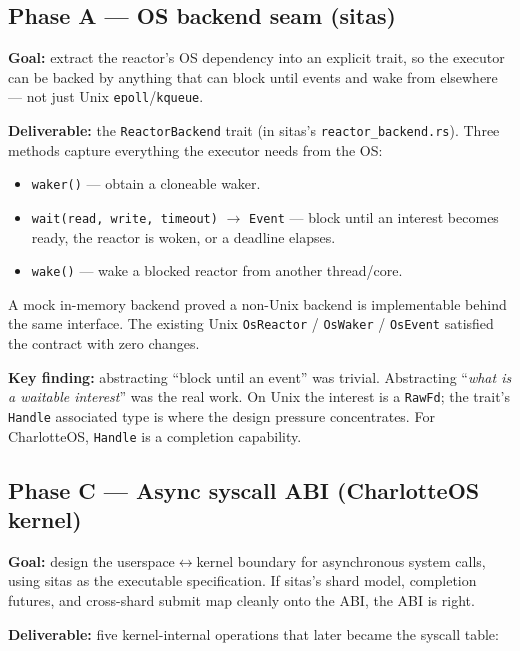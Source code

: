 \subsection{Phase A --- OS backend seam (sitas)}

\textbf{Goal:} extract the reactor's OS dependency into an explicit trait, so
the executor can be backed by anything that can block until events and wake
from elsewhere --- not just Unix \texttt{epoll}/\texttt{kqueue}.

\textbf{Deliverable:} the \texttt{ReactorBackend} trait (in sitas's
\texttt{reactor\_backend.rs}). Three methods capture everything the executor
needs from the OS:

\begin{itemize}
    \item \texttt{waker()} --- obtain a cloneable waker.
    \item \texttt{wait(read, write, timeout)} $\rightarrow$ \texttt{Event} ---
        block until an interest becomes ready, the reactor is woken, or a
        deadline elapses.
    \item \texttt{wake()} --- wake a blocked reactor from another thread/core.
\end{itemize}

A mock in-memory backend proved a non-Unix backend is implementable behind the
same interface. The existing Unix \texttt{OsReactor} / \texttt{OsWaker} /
\texttt{OsEvent} satisfied the contract with zero changes.

\textbf{Key finding:} abstracting ``block until an event'' was trivial.
Abstracting ``\emph{what is a waitable interest}'' was the real work. On Unix
the interest is a \texttt{RawFd}; the trait's \texttt{Handle} associated type
is where the design pressure concentrates. For CharlotteOS, \texttt{Handle} is a
completion capability.

\subsection{Phase C --- Async syscall ABI (CharlotteOS kernel)}

\textbf{Goal:} design the userspace$\leftrightarrow$kernel boundary for
asynchronous system calls, using sitas as the executable specification. If
sitas's shard model, completion futures, and cross-shard submit map cleanly
onto the ABI, the ABI is right.

\textbf{Deliverable:} five kernel-internal operations that later became the
syscall table:

